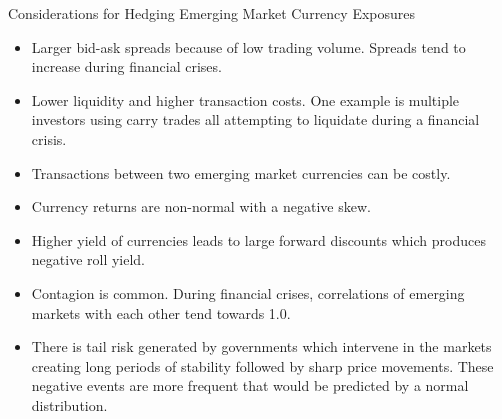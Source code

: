 \documentclass[../custom,grid]{flashcards}
\newcommand{\studyArea}{Risk Management}
\begin{document}
\begin{flashcard}[\studyArea]{Considerations for Hedging Emerging Market Currency Exposures}
    \begin{itemize}
        \item Larger bid-ask spreads because of low trading volume. Spreads tend to increase during financial crises.
        \item Lower liquidity and higher transaction costs. One example is multiple investors using carry trades all attempting to liquidate during a financial crisis.
        \item Transactions between two emerging market currencies can be costly.
        \item Currency returns are non-normal with a negative skew.
        \item Higher yield of currencies leads to large forward discounts which produces negative roll yield.
        \item Contagion is common. During financial crises, correlations of emerging markets with each other tend towards 1.0.
        \item There is tail risk generated by governments which intervene in the markets creating long periods of stability followed by sharp price movements. These negative events are more frequent that would be predicted by a normal distribution.
    \end{itemize}
\end{flashcard}
\end{document}
